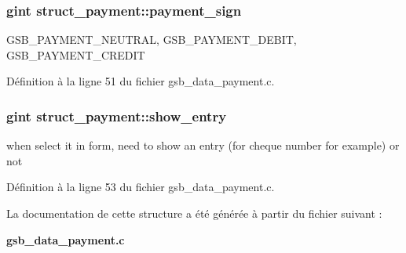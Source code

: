 \subsubsection[{payment\_\-sign}]{\setlength{\rightskip}{0pt plus 5cm}gint {\bf struct\_\-payment::payment\_\-sign}}\label{structstruct__payment_a0fe235ab3c2382848d11811065b3a449}
GSB\_\-PAYMENT\_\-NEUTRAL, GSB\_\-PAYMENT\_\-DEBIT, GSB\_\-PAYMENT\_\-CREDIT 

Définition à la ligne 51 du fichier gsb\_\-data\_\-payment.c.

\subsubsection[{show\_\-entry}]{\setlength{\rightskip}{0pt plus 5cm}gint {\bf struct\_\-payment::show\_\-entry}}\label{structstruct__payment_a5d37735cef6c00aaba5961e5d5bf7a4e}
when select it in form, need to show an entry (for cheque number for example) or not 

Définition à la ligne 53 du fichier gsb\_\-data\_\-payment.c.



La documentation de cette structure a été générée à partir du fichier suivant :\begin{DoxyCompactItemize}
\item 
{\bf gsb\_\-data\_\-payment.c}\end{DoxyCompactItemize}
